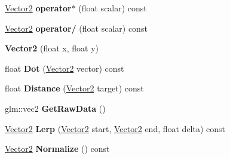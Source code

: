\begin{DoxyCompactItemize}
\item 
\hypertarget{struct_jade_1_1_math_1_1_vector2_a00af05c9a99e29b93becb1c020680b32}{}\hyperlink{struct_jade_1_1_math_1_1_vector2}{Vector2} {\bfseries operator$\ast$} (float scalar) const \label{struct_jade_1_1_math_1_1_vector2_a00af05c9a99e29b93becb1c020680b32}

\item 
\hypertarget{struct_jade_1_1_math_1_1_vector2_a07138fd1c77dad2fe7eade77bc643e24}{}\hyperlink{struct_jade_1_1_math_1_1_vector2}{Vector2} {\bfseries operator/} (float scalar) const \label{struct_jade_1_1_math_1_1_vector2_a07138fd1c77dad2fe7eade77bc643e24}

\item 
\hypertarget{struct_jade_1_1_math_1_1_vector2_ab320239a30e8576e6a644ddfb269b40f}{}{\bfseries Vector2} (float x, float y)\label{struct_jade_1_1_math_1_1_vector2_ab320239a30e8576e6a644ddfb269b40f}

\item 
\hypertarget{struct_jade_1_1_math_1_1_vector2_a1d2536b6708789d9628c42f6f1abf9a3}{}float {\bfseries Dot} (\hyperlink{struct_jade_1_1_math_1_1_vector2}{Vector2} vector) const \label{struct_jade_1_1_math_1_1_vector2_a1d2536b6708789d9628c42f6f1abf9a3}

\item 
\hypertarget{struct_jade_1_1_math_1_1_vector2_a67a147858ef15bad752a6bea93bab5a9}{}float {\bfseries Distance} (\hyperlink{struct_jade_1_1_math_1_1_vector2}{Vector2} target) const \label{struct_jade_1_1_math_1_1_vector2_a67a147858ef15bad752a6bea93bab5a9}

\item 
\hypertarget{struct_jade_1_1_math_1_1_vector2_ac6b232cc4a2097b5a1b159d5995a7e97}{}glm\+::vec2 {\bfseries Get\+Raw\+Data} ()\label{struct_jade_1_1_math_1_1_vector2_ac6b232cc4a2097b5a1b159d5995a7e97}

\item 
\hypertarget{struct_jade_1_1_math_1_1_vector2_a6ac0f505cfb00bb336308686b018d06f}{}\hyperlink{struct_jade_1_1_math_1_1_vector2}{Vector2} {\bfseries Lerp} (\hyperlink{struct_jade_1_1_math_1_1_vector2}{Vector2} start, \hyperlink{struct_jade_1_1_math_1_1_vector2}{Vector2} end, float delta) const \label{struct_jade_1_1_math_1_1_vector2_a6ac0f505cfb00bb336308686b018d06f}

\item 
\hypertarget{struct_jade_1_1_math_1_1_vector2_af8cd5f74f93e70b273eb17ff67569137}{}\hyperlink{struct_jade_1_1_math_1_1_vector2}{Vector2} {\bfseries Normalize} () const \label{struct_jade_1_1_math_1_1_vector2_af8cd5f74f93e70b273eb17ff67569137}


\end{DoxyCompactItemize}
